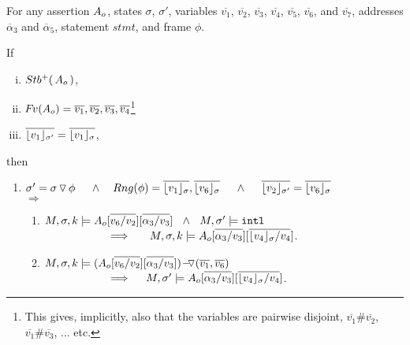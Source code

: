 \begin{lemma}
\label{l:calls}

For any assertion $\Ao$, states $\sigma$, $\sigma'$,  
variables  $\overline{v_1}$,    $\overline{v_2}$,  $\overline{v_3}$,   $\overline{v_4}$,    $\overline{v_5}$,     $\overline{v_6}$, and  $\overline{v_7}$, addresses $\overline \alpha_3$ and $\overline \alpha_5$, 
statement $stmt$, and frame $\phi$.

\noindent
If 
\begin{enumerate}[(i)]
\item 
\label{l:calls:r:one}
$ \Pos \Ao$,  
\item 
\label{l:calls:r:two}
$\fv(\Ao) =  \overline{v_1}, \overline{v_2}, \overline {v_3}, \overline {v_4} $\footnote{This gives, implicitly, also that the variables are pairwise disjoint, \ie $\overline{v_1}\#\overline{v_2}$, $\overline{v_1}\#\overline{v_3}$, ... etc.}
\item 
\label{l:calls:r:four}
 $\overline {\interpret {\sigma'} {v_1} } = \overline {\interpret {\sigma} {v_1} }$, 
\end{enumerate}
 then 
\begin{enumerate}

\item
\label{l:calls:callee}
$\sigma'=\sigma  \pushSymbol \phi  \ \ \ \  \wedge\ \ \  Rng(\phi)= \overline{\interpret {\sigma} {v_1} }, \overline{\interpret {\sigma} {v_6} }\ \ \ \ \wedge \ \  \ \ \overline {\interpret {\sigma'}  {v_2} } = \overline {\interpret {\sigma} {v_6} }$ 
\\ 
$\Longrightarrow$

\begin{enumerate}
\item
\label{l:calls:callee:one}
$\satDAssertFrom M  \sigma k   \Ao[\overline {v_6/v_2}] [\overline {\alpha_3/v_3}] \ \    \wedge\ \ M, \sigma' \models \intThis  $
 \\ 
$\strut \hspace{2cm}  \hfill \Longrightarrow  \ \ \  \   \ \satDAssertFrom M  {\sigma} k  {\Ao[\overline { \alpha_3/v_3}][\overline { {\interpret \sigma {v_4}} / v_4}]}$.


\item
\label{l:calls:callee:two}
$\satDAssertFrom M  \sigma k    {\PushASLong  {(\overline {v_1},\overline {v_6})} {(\Ao[\overline {v_6/v_2}] [\overline {\alpha_3/v_3}])}} $ \\ 
$\strut \hspace{2cm}  \hfill \Longrightarrow  \ \ \  \  
M, \sigma' \models  {\Ao[\overline { \alpha_3/v_3}][\overline { {\interpret \sigma {v_4}} / v_4} ] }$.



\end{enumerate}
\end{enumerate}
\end{lemma}
